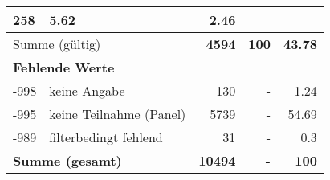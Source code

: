 \begin{longtable}{lXrrr}
       \num{258} &
       \num[round-mode=places,round-precision=2]{5,62} &
         \num[round-mode=places,round-precision=2]{2,46} \\
     \midrule
     \multicolumn{2}{l}{Summe (gültig)} &
       \textbf{\num{4594}} &
     \textbf{100} &
       \textbf{\num[round-mode=places,round-precision=2]{43,78}} \\
     \multicolumn{5}{l}{\textbf{Fehlende Werte}}\\
       -998 &
       keine Angabe &
         \num{130} &
        - &
         \num[round-mode=places,round-precision=2]{1,24} \\
       -995 &
       keine Teilnahme (Panel) &
         \num{5739} &
        - &
         \num[round-mode=places,round-precision=2]{54,69} \\
       -989 &
       filterbedingt fehlend &
         \num{31} &
        - &
         \num[round-mode=places,round-precision=2]{0,3} \\
     \midrule
     \multicolumn{2}{l}{\textbf{Summe (gesamt)}} &
          \textbf{\num{10494}} &
        \textbf{-} &
        \textbf{100} \\
     \bottomrule
     \end{longtable}
     
